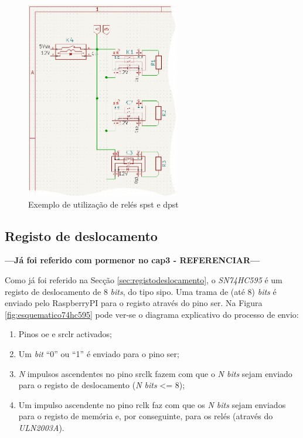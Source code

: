 \begin{figure}[hbtp]
	\centering
	\includegraphics[width=0.6\textwidth]{figures/exemplo_reles_spst.png}
	\caption{Exemplo de utilização de relés \acrshort{spst} e \acrshort{dpst}}
	\label{fig:relespstdpst}
\end{figure}

\subsection{Registo de deslocamento}
\label{sec:hwregistodeslocamento}

\textbf{---Já foi referido com pormenor no cap3 - REFERENCIAR---}

Como já foi referido na Secção \ref{sec:registodeslocamento}, o \textit{SN74HC595} é um registo de deslocamento de 8 \textit{bits}, do tipo \acrshort{sipo}. Uma trama de (até 8) \textit{bits} é enviado pelo \gls{RaspberryPI} para o registo através do pino \acrshort{ser}. Na Figura \ref{fig:esquematico74hc595} pode ver-se o diagrama explicativo do processo de envio:

\begin{enumerate}
	\item Pinos \acrshort{oe} e \acrshort{srclr} activados;
	\item Um \textit{bit} ``0'' ou ``1'' é enviado para o pino \acrshort{ser};
	\item \textit{N} impulsos ascendentes no pino \acrshort{srclk} fazem com que o \textit{N bits} sejam enviado para o registo de deslocamento (\textit{N bits} <= 8);
	\item Um impulso ascendente no pino \acrshort{rclk} faz com que os \textit{N bits} sejam enviados para o registo de memória e, por conseguinte, para os relés (através do \textit{ULN2003A}).
\end{enumerate}

